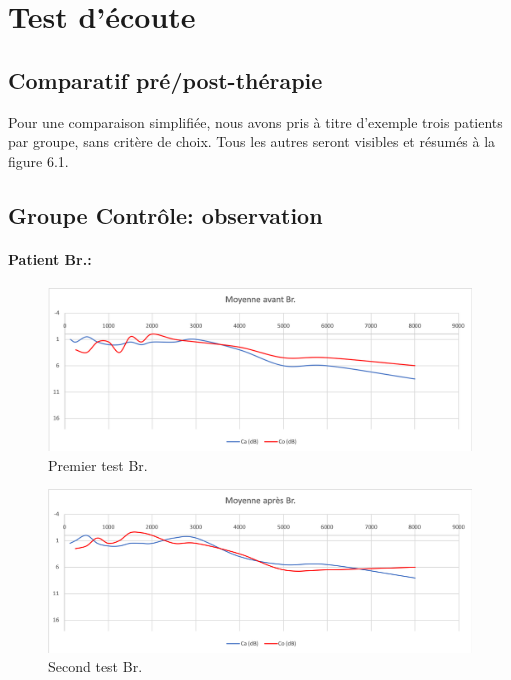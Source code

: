  
 \clearpage

 \section{Test d'écoute}
  \subsection*{Comparatif pré/post-thérapie}
 
 Pour une comparaison simplifiée, nous avons pris à titre d'exemple trois  patients par groupe, sans 
 critère 
 de 
 choix.
 Tous les autres seront visibles et résumés à la figure 6.1.
 \subsection*{Groupe Contrôle: observation}
  \paragraph{ Patient Br.:}
  \begin{figure}[ht]
\centering
\includegraphics[width=1\linewidth]{images/graphiques/bru_pre.png}
\caption[  \textbf{Groupe Contrôle}: Patient Br.. 1° test]{Premier test Br.}
\end{figure}



 \begin{figure}[th]
\centering
\includegraphics[width=1\linewidth]{images/graphiques/bru_post.png}
\caption[Patient Br. :  2° test]{Second test Br.}

\end{figure}

